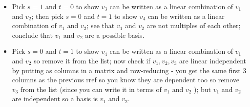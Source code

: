 \documentclass[10pt]{article}
\begin{document}
\begin{itemize}
  \item Pick $s=1$ and $t=0$ to show $v_{3}$ can be written as a linear combination of $v_{1}$ and $v_{2}$; then pick $s=0$ and $t=1$ to show $v_{4}$ can be written as a linear combination of $v_{1}$ and $v_{2}$; see that $v_{1}$ and $v_{2}$ are not multiples of each other; conclude that $v_{1}$ and $v_{2}$ are a possible basis.
  \item Pick $s=0$ and $t=1$ to show $v_{4}$ can be written as a linear combination of $v_{1}$ and $v_{2}$ so remove it from the list; now check if $v_{1}, v_{2}, v_{3}$ are linear independent by putting as columns in a matrix and row-reducing - you get the same first 3 columns as the previous rref so you know they are dependent too so remove $v_{3}$ from the list (since you can write it in terms of $v_{1}$ and $v_{2}$ ); but $v_{1}$ and $v_{2}$ are independent so a basis is $v_{1}$ and $v_{2}$.
\end{itemize}
\end{document}

